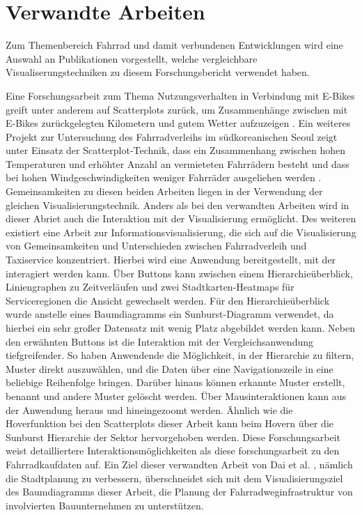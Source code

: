 \documentclass[usegeometry=true]{scrartcl}
\begin{document}
\section{Verwandte Arbeiten}
Zum Themenbereich Fahrrad und damit verbundenen Entwicklungen wird eine Auswahl an Publikationen vorgestellt, welche vergleichbare Visualiserungstechniken zu diesem Forschungsbericht verwendet haben. 

Eine Forschungsarbeit zum Thema Nutzungsverhalten in Verbindung mit E-Bikes greift unter anderem auf Scatterplots zurück, um Zusammenhänge zwischen mit E-Bikes zurückgelegten Kilometern und gutem Wetter aufzuzeigen \cite{Rios.06212016}. Ein weiteres Projekt zur Untersuchung des Fahrradverleihs im südkoreanischen Seoul zeigt unter Einsatz der Scatterplot-Technik, dass ein Zusammenhang zwischen hohen Temperaturen und erhöhter Anzahl an vermieteten Fahrrädern besteht und dass bei hohen Windgeschwindigkeiten weniger Fahrräder ausgeliehen werden \cite{Kashyap.2021}. Gemeinsamkeiten zu diesen beiden Arbeiten liegen in der Verwendung der gleichen Visualisierungstechnik. Anders als bei den verwandten Arbeiten wird in dieser Abriet auch die Interaktion mit der Visualisierung ermöglicht. 
Des weiteren existiert eine Arbeit zur Informationsvisualisierung, die sich auf die Visualisierung von Gemeinsamkeiten und Unterschieden zwischen Fahrradverleih und Taxiservice konzentriert. Hierbei wird eine Anwendung bereitgestellt, mit der interagiert werden kann. Über Buttons kann zwischen einem Hierarchieüberblick, Liniengraphen zu Zeitverläufen und zwei Stadtkarten-Heatmaps für Serviceregionen die Ansicht gewechselt werden. Für den Hierarchieüberblick wurde anstelle eines Baumdiagramms ein Sunburst-Diagramm verwendet, da hierbei ein sehr großer Datensatz mit wenig Platz abgebildet werden kann. Neben den erwähnten Buttons ist die Interaktion mit der Vergleichsanwendung tiefgreifender. So haben Anwendende die Möglichkeit, in der Hierarchie zu filtern, Muster direkt auszuwählen, und die Daten über eine Navigationszeile in eine beliebige Reihenfolge bringen. Darüber hinaus können erkannte Muster erstellt, benannt und andere Muster gelöscht werden. Über Mausinteraktionen kann  aus der Anwendung heraus und hineingezoomt werden. Ähnlich wie die Hoverfunktion bei den Scatterplots dieser Arbeit kann beim Hovern über die Sunburst Hierarchie der Sektor hervorgehoben werden. Diese Forschungsarbeit weist detailliertere Interaktionsmöglichkeiten als diese forschungsarbeit zu den Fahrradkaufdaten auf. Ein Ziel dieser verwandten Arbeit von Dai et al. \cite{Dai.2020}, nämlich die Stadtplanung zu verbessern, überschneidet sich mit dem Visualisierungsziel des Baumdiagramms dieser Arbeit, die Planung der Fahrradweginfrastruktur von involvierten Bauunternehmen zu unterstützen. 
\end{document}
